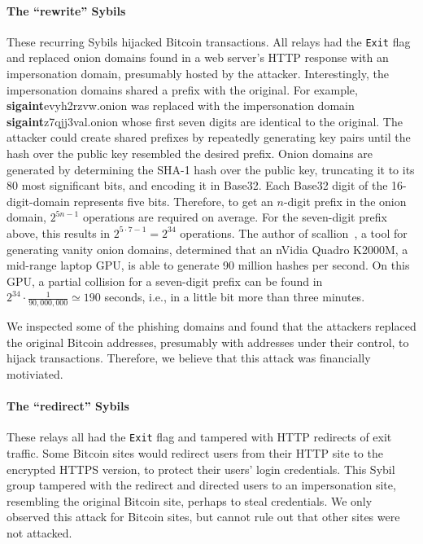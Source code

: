 \paragraph{The ``rewrite'' Sybils}
These recurring Sybils hijacked Bitcoin transactions.  All
relays had the \texttt{Exit} flag and replaced onion domains found in a web
server's HTTP response with an impersonation domain, presumably hosted by the
attacker.  Interestingly, the impersonation domains shared a prefix with the
original.  For example, \textbf{sigaint}evyh2rzvw.onion was replaced with the
impersonation domain \textbf{sigaint}z7qjj3val.onion whose first seven digits
are identical to the original.  The attacker could create shared prefixes by
repeatedly generating key pairs until the hash over the public key resembled the
desired prefix.  Onion domains are generated by determining the SHA-1 hash over
the public key, truncating it to its 80 most significant bits, and encoding it
in Base32.  Each Base32 digit of the 16-digit-domain represents five bits.
Therefore, to get an $n$-digit prefix in the onion domain, $2^{5 n - 1}$
operations are required on average.  For the seven-digit prefix above, this
results in $2^{5 \cdot 7 - 1} = 2^{34}$ operations.  The author of
scallion~\cite{scallion}, a tool for generating vanity onion domains, determined
that an nVidia Quadro K2000M, a mid-range laptop GPU, is able to generate 90
million hashes per second.  On this GPU, a partial collision for a seven-digit
prefix can be found in $2^{34} \cdot \frac{1}{90,000,000} \simeq 190$ seconds,
i.e., in a little bit more than three minutes.

We inspected some of the phishing domains and found that the attackers replaced
the original Bitcoin addresses, presumably with addresses under their control,
to hijack transactions.  Therefore, we believe that this attack was financially
motiviated.

\paragraph{The ``redirect'' Sybils}
These relays all had the \texttt{Exit} flag and tampered with HTTP redirects of
exit traffic.  Some Bitcoin sites would redirect users from their HTTP site to
the encrypted HTTPS version, to protect their users' login credentials.  This
Sybil group tampered with the redirect and directed users to an impersonation
site, resembling the original Bitcoin site, perhaps to steal credentials.  We
only observed this attack for Bitcoin sites, but cannot rule out that other
sites were not attacked.

